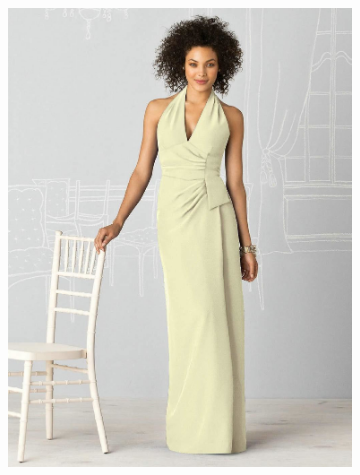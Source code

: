 \documentclass[12pt]{report} %
\begin{document}
	\begin{figure}[H]
		\centering
		\begin{subfigure}{0.4\textwidth}
			\centering
			\includegraphics[width=\linewidth]{ejemplo-sin-mascara.jpg}
		\end{subfigure}
		\begin{subfigure}{0.45\textwidth}
			\centering

\end{subfigure}
\end{figure}
\end{document}
